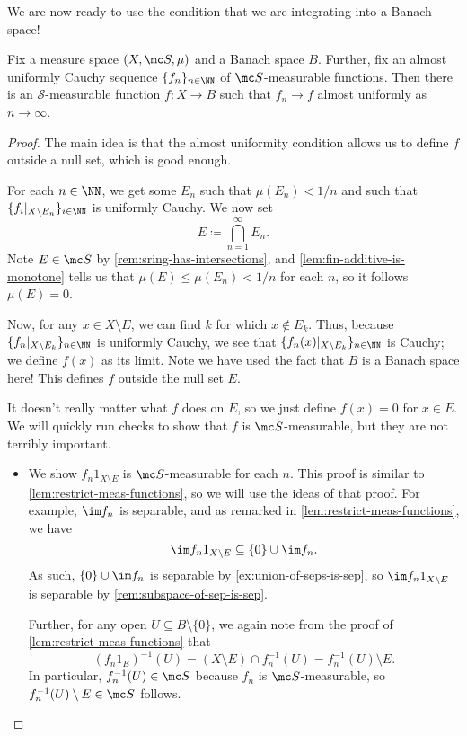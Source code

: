 \documentclass[../notes.tex]{subfiles}
\begin{document}
We are now ready to use the condition that we are integrating into a Banach space!
\begin{lemma}
	Fix a measure space $(X,\mc S,\mu)$ and a Banach space $B$. Further, fix an almost uniformly Cauchy sequence $\{f_n\}_{n\in\NN}$ of $\mc S$-measurable functions. Then there is an $\mathcal S$-measurable function $f\colon X\to B$ such that $f_n\to f$ almost uniformly as $n\to\infty$.
\end{lemma}
\begin{proof}
	The main idea is that the almost uniformity condition allows us to define $f$ outside a null set, which is good enough.

	For each $n\in\NN$, we get some $E_n$ such that $\mu(E_n)<1/n$ and such that $\{f_i|_{X\setminus E_n}\}_{i\in\NN}$ is uniformly Cauchy. We now set
	\[E\coloneqq\bigcap_{n=1}^\infty E_n.\]
	Note $E\in\mc S$ by \autoref{rem:sring-has-intersections}, and \autoref{lem:fin-additive-is-monotone} tells us that $\mu(E)\le\mu(E_n)<1/n$ for each $n$, so it follows $\mu(E)=0$.

	Now, for any $x\in X\setminus E$, we can find $k$ for which $x\notin E_k$. Thus, because $\{f_n|_{X\setminus E_k}\}_{n\in\NN}$ is uniformly Cauchy, we see that $\{f_n(x)|_{X\setminus E_k}\}_{n\in\NN}$ is Cauchy; we define $f(x)$ as its limit. Note we have used the fact that $B$ is a Banach space here! This defines $f$ outside the null set $E$.
	
	It doesn't really matter what $f$ does on $E$, so we just define $f(x)=0$ for $x\in E$. We will quickly run checks to show that $f$ is $\mc S$-measurable, but they are not terribly important.
	\begin{itemize}
		\item We show $f_n1_{X\setminus E}$ is $\mc S$-measurable for each $n$. This proof is similar to \autoref{lem:restrict-meas-functions}, so we will use the ideas of that proof. For example, $\im f_n$ is separable, and as remarked in \autoref{lem:restrict-meas-functions}, we have
		\[\im f_n1_{X\setminus E}\subseteq\{0\}\cup\im f_n.\]
		As such, $\{0\}\cup\im f_n$ is separable by \autoref{ex:union-of-seps-is-sep}, so $\im f_n1_{X\setminus E}$ is separable by \autoref{rem:subspace-of-sep-is-sep}.

		Further, for any open $U\subseteq B\setminus\{0\}$, we again note from the proof of \autoref{lem:restrict-meas-functions} that
		\[(f_n1_E)^{-1}(U)=(X\setminus E)\cap f_n^{-1}(U)=f_n^{-1}(U)\setminus E.\]
		In particular, $f_n^{-1}(U)\in\mc S$ because $f_n$ is $\mc S$-measurable, so $f_n^{-1}(U)\setminus E\in\mc S$ follows.


\end{itemize}
\end{proof}
\end{document}
